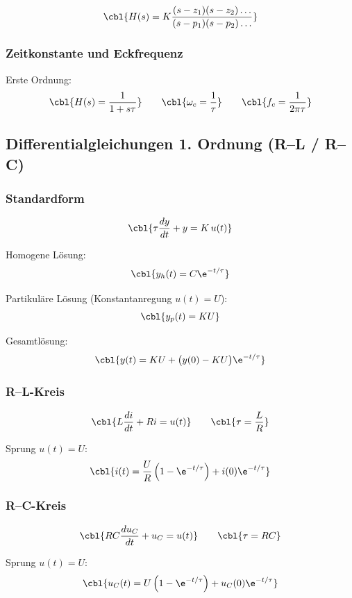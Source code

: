 \[
\cbl{H(s)=K \frac{(s-z_1)(s-z_2)\dots}{(s-p_1)(s-p_2)\dots}}
\]

\subsubsection{Zeitkonstante und Eckfrequenz}

Erste Ordnung:
\[
\cbl{H(s)=\frac{1}{1+s\tau}}
\qquad
\cbl{\omega_c = \frac{1}{\tau}}
\qquad
\cbl{f_c = \frac{1}{2\pi\tau}}
\]

\subsection{Differentialgleichungen 1. Ordnung (R--L / R--C)}

\subsubsection{Standardform}

\[
\cbl{\tau \frac{dy}{dt} + y = K \, u(t)}
\]

Homogene Lösung:
\[
\cbl{y_h(t) = C \e^{-t/\tau}}
\]

Partikuläre Lösung (Konstantanregung $u(t)=U$):
\[
\cbl{y_p(t)=K U}
\]

Gesamtlösung:
\[
\cbl{y(t) = K U + \big(y(0)-K U\big)\e^{-t/\tau}}
\]

\subsubsection{R--L-Kreis}

\[
\cbl{L\frac{di}{dt} + Ri = u(t)}
\qquad
\cbl{\tau = \frac{L}{R}}
\]

Sprung $u(t)=U$:
\[
\cbl{i(t) = \frac{U}{R}\left(1-\e^{-t/\tau}\right) + i(0)\e^{-t/\tau}}
\]

\subsubsection{R--C-Kreis}

\[
\cbl{RC\frac{du_C}{dt} + u_C = u(t)}
\qquad
\cbl{\tau = RC}
\]

Sprung $u(t)=U$:
\[
\cbl{u_C(t) = U\left(1-\e^{-t/\tau}\right) + u_C(0)\e^{-t/\tau}}
\]



